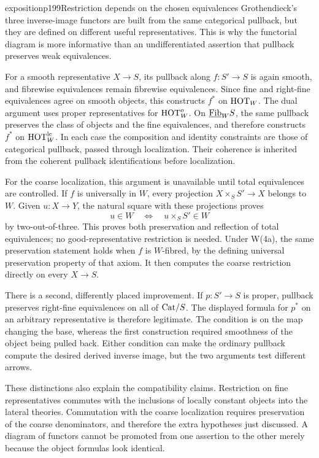 \begin{dcomment}{exposition}{p199}{Restriction depends on the chosen equivalences}
Grothendieck's three inverse-image functors are built from the same categorical pullback, but they are defined on different useful representatives. This is why the functorial diagram is more informative than an undifferentiated assertion that pullback preserves weak equivalences.

For a smooth representative $X\to S$, its pullback along $f:S'\to S$ is again smooth, and fibrewise equivalences remain fibrewise equivalences. Since fine and right-fine equivalences agree on smooth objects, this constructs $f^*$ on $\mathrm{HOT}_W$. The dual argument uses proper representatives for $\mathrm{HOT}_W^o$. On $\underline{\mathrm{Fib}}_W S$, the same pullback preserves the class of objects and the fine equivalences, and therefore constructs $f^*$ on $\mathrm{HOT}_W^{\mathrm{lc}}$. In each case the composition and identity constraints are those of categorical pullback, passed through localization. Their coherence is inherited from the coherent pullback identifications before localization.

For the coarse localization, this argument is unavailable until total equivalences are controlled. If $f$ is universally in $W$, every projection $X\times_S S'\to X$ belongs to $W$. Given $u:X\to Y$, the natural square with these projections proves
\[
 u\in W\quad\Longleftrightarrow\quad
 u\times_S S'\in W
\]
by two-out-of-three. This proves both preservation and reflection of total equivalences; no good-representative restriction is needed. Under W(4a), the same preservation statement holds when $f$ is $W$-fibred, by the defining universal preservation property of that axiom. It then computes the coarse restriction directly on every $X\to S$.

There is a second, differently placed improvement. If $p:S'\to S$ is proper, pullback preserves right-fine equivalences on all of $\mathrm{Cat}/S$. The displayed formula for $p^*$ on an arbitrary representative is therefore legitimate. The condition is on the map changing the base, whereas the first construction required smoothness of the object being pulled back. Either condition can make the ordinary pullback compute the desired derived inverse image, but the two arguments test different arrows.

These distinctions also explain the compatibility claims. Restriction on fine representatives commutes with the inclusions of locally constant objects into the lateral theories. Commutation with the coarse localization requires preservation of the coarse denominators, and therefore the extra hypotheses just discussed. A diagram of functors cannot be promoted from one assertion to the other merely because the object formulas look identical.
\end{dcomment}


